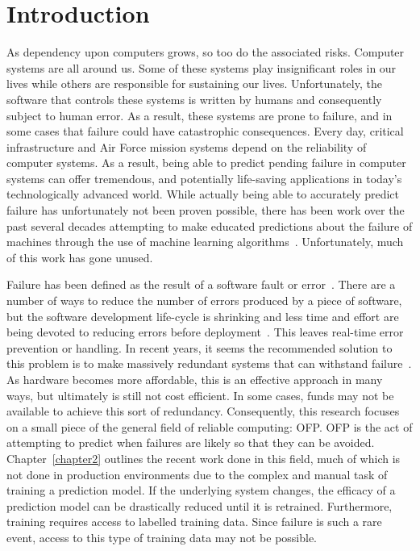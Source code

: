 \chapter{Introduction} \label{chapter1}
As dependency upon computers grows, so too do the associated risks.  Computer
systems are all around us.  Some of these systems play insignificant
roles in our lives while others are responsible for sustaining our lives.
Unfortunately, the software that controls these systems is written by humans
and consequently subject to human error.  As a result, these systems are prone
to failure, and in some cases that failure could have catastrophic
consequences.  Every day, critical infrastructure and Air Force mission systems
depend on the reliability of computer systems.  As a result, being able to
predict pending failure in computer systems can offer tremendous, and
potentially life-saving applications in today's technologically advanced world.
While actually being able to accurately predict failure has unfortunately not
been proven possible, there has been work over the past several decades
attempting to make educated predictions about the failure of machines through
the use of machine learning algorithms~\cite{salfnerSurvey}.  Unfortunately,
much of this work has gone unused.  

Failure has been defined as the result of a software fault or
error~\cite{salfnerSurvey}.  There are a number of ways to reduce the number of
errors produced by a piece of software, but the software development life-cycle
is shrinking and less time and effort are being devoted to reducing errors
before deployment~\cite{schmidt2016}.  This leaves real-time error prevention
or handling.  In recent years, it seems the recommended solution to this
problem is to make massively redundant systems that can withstand
failure~\cite{bauer2012}.  As hardware becomes more affordable, this is an
effective approach in many ways, but ultimately is still not cost efficient.
In some cases, funds may not be available to achieve this sort of redundancy.
Consequently, this research focuses on a small piece of the general field of
reliable computing: \ac{OFP}.  \ac{OFP} is the act of attempting to predict
when failures are likely so that they can be avoided.  Chapter~\ref{chapter2}
outlines the recent work done in this field, much of which is not done in
production environments due to the complex and manual task of training a
prediction model.  If the underlying system changes, the efficacy of a
prediction model can be drastically reduced until it is retrained.
Furthermore, training requires access to labelled training data.  Since failure
is such a rare event, access to this type of training data may not be possible.


